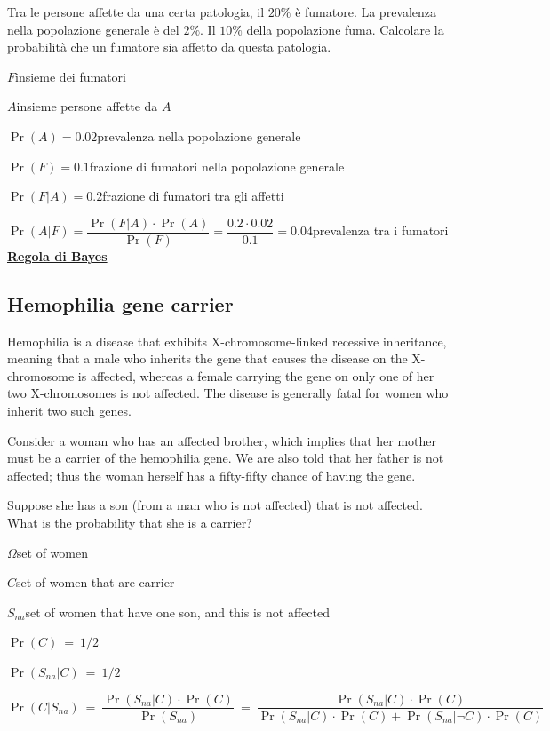 \documentclass[11pt,openany]{book}
\begin{document}
Tra le persone affette da una certa patologia, il $20\%$ è fumatore. La prevalenza nella popolazione generale è del $2\%$. Il $10\%$ della popolazione fuma. Calcolare la probabilità che un fumatore sia affetto da questa patologia.


$F$\hfill insieme dei fumatori

$A$\hfill insieme persone affette da $A$

$\Pr(A)=0.02$\hfill prevalenza nella popolazione generale

$\Pr(F)=0.1$\hfill frazione di fumatori nella popolazione generale

$\Pr(F|A)=0.2$\hfill frazione di fumatori tra gli affetti

$\Pr(A|F)=\dfrac{\Pr(F|A)\cdot \Pr(A)}{\Pr(F)}=\dfrac{0.2\cdot0.02}{0.1}=0.04$\hfill prevalenza tra i fumatori
\clearpage\hfill
\hfill\textbf{{\color{brown}\hyperref[RegolaBayes]{Regola di Bayes} \faShare}}
\subsection{Hemophilia gene carrier }
\label{Hemophilia}

Hemophilia is a disease that exhibits X-chromosome-linked recessive inheritance, meaning that a male who inherits the gene that causes the disease on the X-chromosome is affected, whereas a
female carrying the gene on only one of her two X-chromosomes is not affected. The disease is generally fatal for women who inherit two such genes.

Consider a woman who has an affected brother, which implies that her mother must be a carrier of the hemophilia gene. We are also told that her father is not affected; thus the woman herself has a fifty-fifty chance of having the gene.

Suppose she has a son (from a man who is not affected) that is not affected. What is the probability that she is a carrier?

$\Omega$\hfill  set of women 

$C$\hfill set of women that are carrier

$S_{na}$\hfill set of women that have one son, and this is not affected

$\Pr(C)\ =\ 1/2$\hfill 

$\Pr(S_{na}|C)\ =\ 1/2$\hfill 

$\Pr(C|S_{na})\ =\ \dfrac{\Pr(S_{na}|C)\cdot \Pr(C)}{\Pr(S_{na})}\ =\ \dfrac{\Pr(S_{na}|C)\cdot \Pr(C)}{\Pr(S_{na}|C)\cdot \Pr(C)+\Pr(S_{na}|\neg C)\cdot \Pr(C)}$
\end{document}
